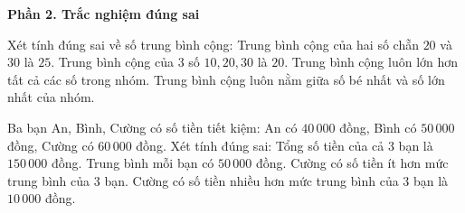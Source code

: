 \textbf{Phần 2. Trắc nghiệm đúng sai}

\begin{ex} %
Xét tính đúng sai về số trung bình cộng:
\choiceTF
{\True Trung bình cộng của hai số chẵn $20$ và $30$ là $25$.}
{\True Trung bình cộng của 3 số $10, 20, 30$ là $20$.}
{Trung bình cộng luôn lớn hơn tất cả các số trong nhóm.}
{\True Trung bình cộng luôn nằm giữa số bé nhất và số lớn nhất của nhóm.}
\end{ex}

\begin{ex} %
Ba bạn An, Bình, Cường có số tiền tiết kiệm: An có $40\,000$ đồng, Bình có $50\,000$ đồng, Cường có $60\,000$ đồng. Xét tính đúng sai:
\choiceTF
{\True Tổng số tiền của cả 3 bạn là $150\,000$ đồng.}
{\True Trung bình mỗi bạn có $50\,000$ đồng.}
{Cường có số tiền ít hơn mức trung bình của 3 bạn.}
{\True Cường có số tiền nhiều hơn mức trung bình của 3 bạn là $10\,000$ đồng.}
\end{ex}

